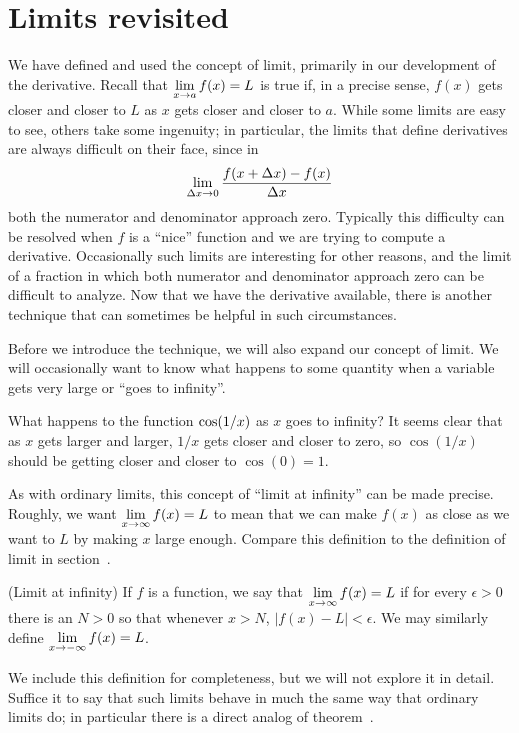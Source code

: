 \section{Limits revisited}{}{}
\nobreak
We have defined and used the concept of limit, primarily in our
development of the derivative. Recall that $\displaystyle \lim_{x\to a}f(x)=L$ is
true if, in a precise sense, $f(x)$ gets closer and closer to $L$ as
$x$ gets closer and closer to $a$. While some limits are easy to see,
others take some ingenuity; in particular, the limits that define
derivatives are always difficult on their face, since in 
$$\lim_{\Delta x\to 0} {f(x+\Delta x)-f(x)\over \Delta x}$$
both the numerator and denominator approach zero. Typically this
difficulty can be resolved when $f$ is a ``nice'' function and we are
trying to compute a derivative. Occasionally such limits are
interesting for other reasons, and the limit of a fraction in which
both numerator and denominator approach zero can be difficult to
analyze. Now that we have the derivative available, there is another
technique that can sometimes be helpful in such circumstances.

Before we introduce the technique, we will also expand our concept of
limit. We will occasionally want to know what happens to some quantity
when a variable gets very large or ``goes to infinity''.

\begin{example}
What happens to the function $\displaystyle \cos(1/x)$ as $x$ goes to infinity? It
seems clear that as $x$ gets larger and larger, $1/x$ gets closer and
closer to zero, so $\cos(1/x)$ should be getting closer and closer to 
$\cos(0)=1$.
\end{example}

As with ordinary limits, this concept of ``limit at infinity'' can be
made precise. Roughly, we want $\displaystyle \lim_{x\to \infty}f(x)=L$ to mean that
we can make $f(x)$ as close as we want to $L$ by making $x$ large
enough. Compare this definition to the definition of limit in 
section~.

\begin{definition} (Limit at infinity) If $f$ is a function, we say that $\displaystyle \lim_{x\to
  \infty}f(x)=L$ if for every $\epsilon>0$ there is an $N > 0$ so that
  whenever $x>N$, $|f(x)-L|<\epsilon$.
We may similarly define $\displaystyle \lim_{x\to-\infty}f(x)=L$.
\label{defn:limit at infinity}
\end{definition}

We include this definition for completeness, but we will not explore it in
detail. Suffice it to say that such limits behave in much the same way
that ordinary limits do; in particular there is a direct analog of 
theorem~.

